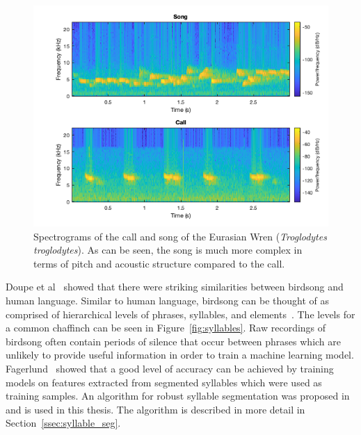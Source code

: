 \begin{figure}[ht]
  \centering
  \includegraphics[width=\textwidth]{figures/wren_call_song_spectrogram.png}
  \caption{Spectrograms of the call and song of the Eurasian Wren
    (\textit{Troglodytes troglodytes}). As can be seen, the song is much more complex in terms of pitch and acoustic structure compared to the
  call.}\label{fig:wren_call_song_spectrogram}
\end{figure}

Doupe et al~\cite{birdsongspeech} showed that there were striking similarities
between birdsong and human language. Similar to human language, birdsong can be
thought of as comprised of hierarchical levels of phrases, syllables, and
elements~\cite{catchpole2003bird}. The levels for a common chaffinch can be seen
in Figure~\ref{fig:syllables}. Raw recordings of birdsong
often contain periods of silence that occur between phrases which are unlikely
to provide useful information in order to train a machine learning model.
Fagerlund~\cite{fagerlund2007bird} showed that a good level of accuracy can be
achieved by training models on features extracted from segmented syllables which
were used as training samples. An algorithm for robust syllable segmentation was
proposed in~\cite{fagerlund2004automatic} and is used in this thesis. The
algorithm is described in more detail in Section~\ref{ssec:syllable_seg}.

